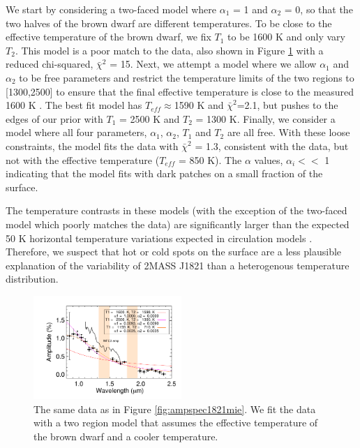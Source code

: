 \documentclass[twocolumn]{aastex6}
\begin{document}
We start by considering a two-faced model where $\alpha_1$ = 1 and $\alpha_2$ = 0, so that the two halves of the brown dwarf are different temperatures.
To be close to the effective temperature of the brown dwarf, we fix $T_1$ to be 1600 K and only vary $T_2$.
This model is a poor match to the data, also shown in Figure \ref{fig:ampspec1821tdiff} with a reduced chi-squared, $\bar{\chi}^2$ = 15.
Next, we attempt a model where we allow $\alpha_1$ and $\alpha_2$ to be free parameters and restrict the temperature limits of the two regions to [1300,2500] to ensure that the final effective temperature is close to the measured 1600 K \citep{gagne2015banyan7}.
The best fit model has $T_{eff} \approx $1590 K and $\bar{\chi}^2$=2.1, but pushes to the edges of our prior with $T_1$ = 2500 K and $T_2$ = 1300 K.
Finally, we consider a model where all four parameters, $\alpha_1$, $\alpha_2$, $T_1$ and $T_2$ are all free.
With these loose constraints, the model fits the data with $\bar{\chi}^2$ = 1.3, consistent with the data, but not with the effective temperature ($T_{eff}$ = 850 K).
The $\alpha$ values,  $\alpha_i <<$ 1 indicating that the model fits with dark patches on a small fraction of the surface.

The temperature contrasts in these models (with the exception of the two-faced model which poorly matches the data) are significantly larger than the expected 50 K horizontal temperature variations expected in circulation models \citep{showman2013bdgpDynamics}.
Therefore, we suspect that hot or cold spots on the surface are a less plausible explanation of the variability of 2MASS J1821 than a heterogenous temperature distribution.

\begin{figure}
\begin{centering}
\includegraphics[width=0.5\textwidth]{amp_vs_wavl_j1821_t_diff.pdf}
\caption{The same data as in Figure \ref{fig:ampspec1821mie}. We fit the data with a two region model that assumes the effective temperature of the brown dwarf and a cooler temperature.}\label{fig:ampspec1821tdiff}
\end{centering}
\end{figure}
\end{document}
